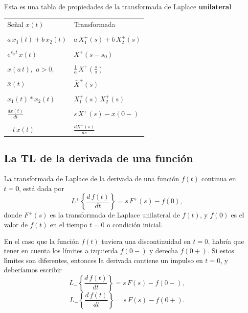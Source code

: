 Esta es una tabla de propiedades de la transformada de Laplace \textbf{unilateral}
\begin{center}
  \begin{tabular}{ll}
Se\~{n}al $x(t)$                        &       Transformada                            \\
& \\
$a \, x_{1}(t) + b \, x_{2}(t)$               &       $a \, X_{1}^{+}(s) + b \, X_{2}^{+}(s)$   \\
& \\
$e^{s_{0} \, t} \, x(t)$                      &       $X^{+}(s-s_{0})$                      \\
& \\
$x(a \, t),$ $a > 0,$                       &       $\frac{1}{a} \, X^{+}(\frac{s}{a})$      \\
& \\
$\bar{x}(t)$                       &       $\bar{X}^{+}(s)$                       \\
& \\
$x_{1}(t) * x_{2}(t)$                   &       $X_{1}^{+}(s) \, X_{2}^{+}(s)$         \\
& \\
$\frac{dx(t)}{dt}$                      &       $s \, X^{+}(s) - x(0-)$               \\
& \\
$-t \, x(t)$                               &       $\frac{dX^{+}(s)}{ds}$                      \\
        \end{tabular}
\end{center}

\subsection{La TL de la derivada de una función}

La transformada de Laplace de la derivada de una funci\'{o}n $f(t)$ continua en $t = 0$, 
est\'{a} dada por
\begin{equation}
L^{+} \left\{ \frac{d \, f(t)}{dt}\right\} = s \, F^{+}(s) - f(0),
\end{equation}
donde $F^{+}(s)$ es la transformada de Laplace unilateral de $f(t)$, y 
$f(0)$ es el valor de $f(t)$ en el tiempo $t = 0$ o condición inicial.

En el caso que la funci\'{o}n $f(t)$ tuviera una discontinuidad en $t = 0$, 
habr\'{i}a que tener en cuenta los l\'{i}mites a izquierda $f(0-)$ y derecha $f(0+)$. 
Si estos l\'{\i}mites son diferentes, entonces la derivada contiene un impulso en $t = 0$, 
y deber\'{i}amos escribir
\begin{equation}
L_{-}\left\{ \frac{d \, f(t)}{dt}\right\} = s \, F(s) - f(0-),
\end{equation}
\begin{equation}
L_{+}\left\{ \frac{d \, f(t)}{dt}\right\} = s \, F(s) - f(0+).
\end{equation}

